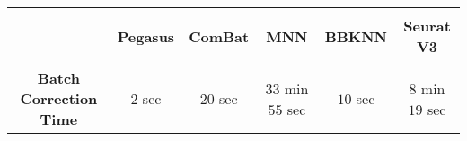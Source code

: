 \documentclass{article}
\begin{document}
\begin{center}
\begin{tabular}{|c|c|c|c|c|c|}\hline
& & & & & \\[-10pt]
 & \textbf{Pegasus} & \textbf{ComBat} & \textbf{MNN} & \textbf{BBKNN} & \textbf{Seurat V3}\\[2pt]\hline
 & & & & & \\[-10pt]
 \textbf{Batch Correction Time} & $2$ sec & $20$ sec & $33$ min $55$ sec & $10$ sec & $8$ min $19$ sec  \\[2pt]\hline
\end{tabular}
\end{center}
\end{document}
